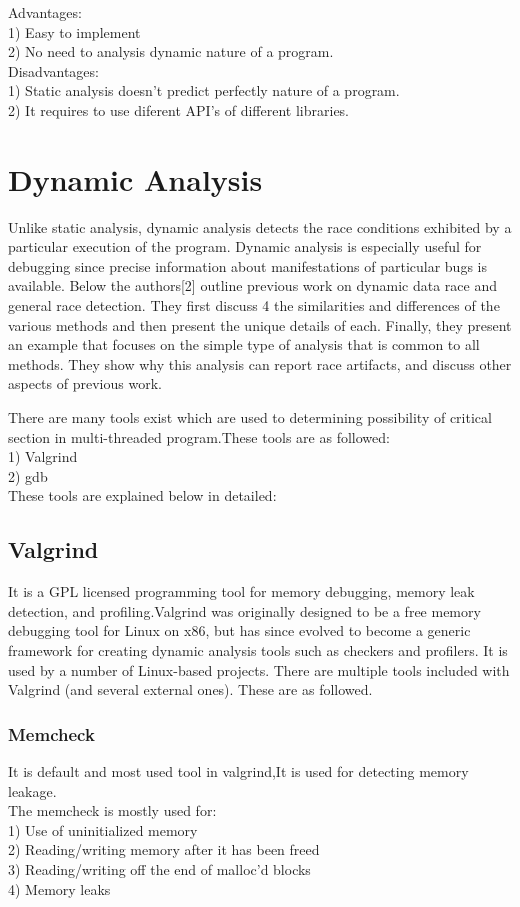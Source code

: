 Advantages:\\
1) Easy to implement\\
2) No need to analysis dynamic nature of a program.\\
Disadvantages:\\
1) Static analysis doesn't predict perfectly nature of a program.\\
2) It requires to use diferent API's of different libraries.\\

\section{Dynamic Analysis}
Unlike static analysis, dynamic analysis detects the race conditions exhibited by a particular execution of the program. Dynamic analysis is especially useful for debugging since precise information about manifestations of particular bugs is available. Below the authors[2] outline previous work on dynamic data race and general race detection. They first discuss 4 the similarities and differences of the various methods and then present the unique details of each. Finally, they present an example that focuses on the simple type of analysis that is common to all methods. They show why this analysis can report race artifacts, and discuss other aspects of previous work.

There are many tools exist which are used to determining possibility of critical section in multi-threaded program.These tools are as followed:\\
1) Valgrind\\
2) gdb\\

These tools are explained below in detailed:
\newpage
\subsection{Valgrind}
It is a GPL licensed programming tool for memory debugging, memory leak detection, and profiling.Valgrind was originally designed to be a free memory debugging tool for Linux on x86, but has since evolved to become a generic framework for creating dynamic analysis tools such as checkers and profilers. It is used by a number of Linux-based projects.
There are multiple tools included with Valgrind (and several external ones). These are as followed. 

\subsubsection{Memcheck}
It is default and most used tool in valgrind,It is used for detecting memory leakage.\\
The memcheck is mostly used for:\\
1) Use of uninitialized memory \\
2) Reading/writing memory after it has been freed \\
3) Reading/writing off the end of malloc'd blocks \\
4) Memory leaks

